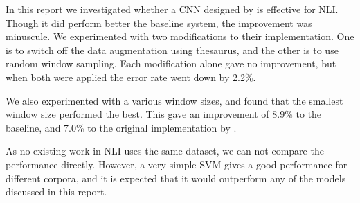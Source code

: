 In this report we investigated whether a CNN designed by \cite{zhang2015character} is effective for NLI.
Though it did perform better the baseline system, the improvement was minuscule. 
We experimented with two modifications to their implementation. One is to switch off the data augmentation using thesaurus, and the other is to use random window sampling.
Each modification alone gave no improvement, but when both were applied the error rate went down by 2.2\%.

We also experimented with a various window sizes, and found that the smallest window size performed the best. This gave an improvement of 8.9\% to the baseline, and 7.0\% to the original implementation by \cite{zhang2015character}.

As no existing work in NLI uses the same dataset, we can not compare the performance directly.
However, a very simple SVM gives a good performance for different corpora, and it is expected that it would outperform any of the models discussed in this report. 
